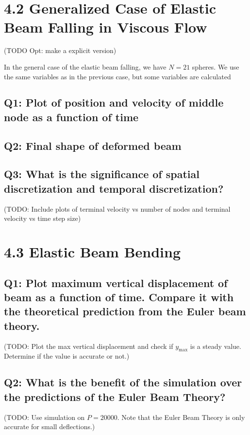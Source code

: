 \documentclass[letterpaper, 10 pt, conference]{ieeeconf}  %
\begin{document}
\section{4.2 Generalized Case of Elastic Beam Falling in Viscous Flow}

(TODO Opt: make a explicit version)

In the general case of the elastic beam falling, we have $N = 21$ spheres. We use the same variables as in the previous case, but some variables are calculated
\subsection{Q1: Plot of position and velocity of middle node as a function of time}

\subsection{Q2: Final shape of deformed beam}

\subsection{Q3: What is the significance of spatial discretization and temporal discretization? }

(TODO: Include plots of terminal velocity vs number of nodes and terminal velocity vs time step size)




\section{4.3 Elastic Beam Bending}

\subsection{Q1: Plot maximum vertical displacement of beam as a function of time. Compare it with the theoretical prediction from the Euler beam theory.}

(TODO: Plot the max vertical displacement and check if $y_{\text{max}}$ is a steady value. Determine if the value is accurate or not.)

\subsection{Q2: What is the benefit of the simulation over the predictions of the Euler Beam Theory?}

(TODO: Use simulation on $P = 20000$. Note that the Euler Beam Theory is only accurate for small deflections.)
\end{document}
